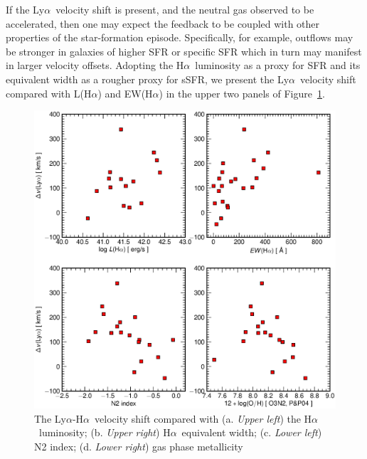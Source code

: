 \documentclass[manuscript]{emulateapj}
\newcommand{\lya}{Ly$\alpha$}
\newcommand{\ha}{H$\alpha$}
\begin{document}
If the \lya\ velocity shift is present, and the neutral gas observed to 
be accelerated, then one may expect the feedback to be coupled with other
properties of the star-formation episode. 
 Specifically, for example, outflows may be stronger in 
galaxies of higher SFR or specific SFR which in turn may manifest in 
larger velocity offsets. Adopting the \ha\ luminosity as a proxy for SFR
and its equivalent width as a rougher proxy for sSFR, we present the \lya\ 
velocity shift compared with L(\ha) and EW(\ha) in the upper two panels
of Figure~\ref{fig:dvha}. 

\begin{figure}[t!]
   \centering
   \includegraphics[scale=.4]{dvel_ha.eps}
   \caption{The \lya-\ha\ velocity shift compared with 
			 (a. \emph{Upper left}) the \ha\ luminosity; 
			 (b. \emph{Upper right}) \ha\ equivalent width; 
			 (c. \emph{Lower left}) N2 index; 
			 (d. \emph{Lower right}) gas phase metallicity }
   \label{fig:dvha}
\end{figure}
\end{document}
